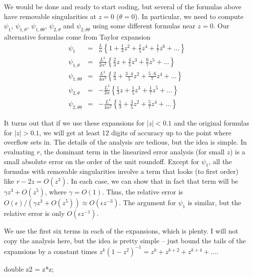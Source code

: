 We would be done and ready to start coding, but several of the formulas
above have removable singularities at $z = 0$ ($\theta = 0$).  In
particular, we need to compute $\psi_1$, $\psi_{1, \theta}$,
$\psi_{1, \theta \theta}$, $\psi_{2, \theta}$ and $\psi_{2, \theta \theta}$
using some different formulas near $z = 0$.  Our alternative formulas
come from Taylor expansion
\begin{eqnarray*}
  \psi_1 & = & \frac{L}{\alpha} \left\{
    1 + \frac{1}{3}z^2 + \frac{1}{5} z^4 + \frac{1}{7} z^6 + \ldots
  \right\}
\\
  \psi_{1,\theta} & = & \frac{L^2}{2 \alpha^2} \left\{
    \frac{2}{3} z + \frac{4}{5} z^3 + \frac{6}{7} z^5 + \ldots
  \right\}
\\
  \psi_{1,\theta \theta} & = & \frac{L^3}{4 \alpha^3} \left\{
    \frac{2}{3} + \frac{3 \cdot 4}{5} z^2 + \frac{5 \cdot 6}{7} z^4 + \ldots
  \right\}
\\
  \psi_{2,\theta} & = & -\frac{L^2}{2 \alpha} \left\{
    \frac{1}{3} z + \frac{1}{5} z^3 + \frac{1}{7} z^5 + \ldots
  \right\}
\\
  \psi_{2,\theta \theta} & = & -\frac{L^3}{4 \alpha^2} \left\{
    \frac{1}{3} + \frac{3}{5} z^2 + \frac{5}{7} z^4 + \ldots
  \right\}
\end{eqnarray*}

It turns out that if we use these expansions for $|z| < 0.1$ and the
original formulas for $|z| > 0.1$, we will get at least 12 digits of
accuracy up to the point where overflow sets in.  The details of the
analysis are tedious, but the idea is simple.  In evaluating $r$,
the dominant term in the linearized error analysis (for small $z$)
is a small absolute error on the order of the unit roundoff.
Except for $\psi_1$, all the formulas with removable singularities
involve a term that looks (to first order) like $r - 2z = O(z^3)$.
In each case, we can show that in fact that term will be 
$\gamma z^3 + O(z^5)$, where $\gamma = O(1)$.  Thus, the relative error
is $O(\epsilon) / (\gamma z^3 + O(z^5)) \approx O(\epsilon z^{-3})$.
The argument for $\psi_1$ is similar, but the relative error is only
$O(\epsilon z^{-1})$.

We use the first six terms in each of the expansions, which is plenty.
I will not copy the analysis here, but the idea is pretty simple --
just bound the tails of the expansions by a constant times
$z^k (1-z^2)^{-1} = z^k + z^{k+2} + z^{k+4} + \ldots$.

\nwenddocs{}\endmoddef
double z2 = z*z;

